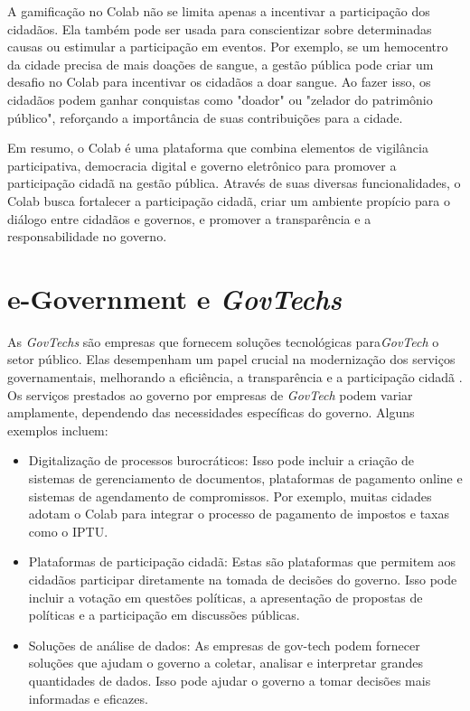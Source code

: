 A gamificação no Colab não se limita apenas a incentivar a participação dos cidadãos. Ela também pode ser usada para conscientizar sobre determinadas causas ou estimular a participação em eventos. Por exemplo, se um hemocentro da cidade precisa de mais doações de sangue, a gestão pública pode criar um desafio no Colab para incentivar os cidadãos a doar sangue. Ao fazer isso, os cidadãos podem ganhar conquistas como "doador" ou "zelador do patrimônio público", reforçando a importância de suas contribuições para a cidade.

Em resumo, o Colab é uma plataforma que combina elementos de vigilância participativa, democracia digital e governo eletrônico para promover a participação cidadã na gestão pública. Através de suas diversas funcionalidades, o Colab busca fortalecer a participação cidadã, criar um ambiente propício para o diálogo entre cidadãos e governos, e promover a transparência e a responsabilidade no governo.

\section{e-Government e \textit{GovTechs}}

As \textit{GovTechs} são empresas que fornecem soluções tecnológicas para\textit{GovTech} o setor público. Elas desempenham um papel crucial na modernização dos serviços governamentais, melhorando a eficiência, a transparência e a participação cidadã \cite{2022_Kononenko}. Os serviços prestados ao governo por empresas de \textit{GovTech} podem variar amplamente, dependendo das necessidades específicas do governo. Alguns exemplos incluem:

\begin{itemize}
	\item Digitalização de processos burocráticos: Isso pode incluir a criação de sistemas de gerenciamento de documentos, plataformas de pagamento online e sistemas de agendamento de compromissos. Por exemplo, muitas cidades adotam o Colab para integrar o processo de pagamento de impostos e taxas como o IPTU.
	\item Plataformas de participação cidadã: Estas são plataformas que permitem aos cidadãos participar diretamente na tomada de decisões do governo. Isso pode incluir a votação em questões políticas, a apresentação de propostas de políticas e a participação em discussões públicas.
	\item Soluções de análise de dados: As empresas de gov-tech podem fornecer soluções que ajudam o governo a coletar, analisar e interpretar grandes quantidades de dados. Isso pode ajudar o governo a tomar decisões mais informadas e eficazes.
\end{itemize}

